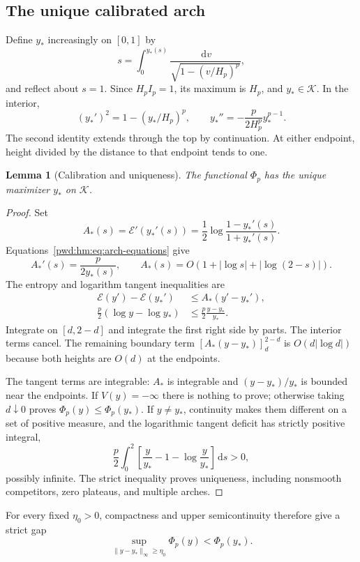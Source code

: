 \documentclass[11pt,letterpaper]{article}
\numberwithin{equation}{section}
\newtheorem{lemma}[theorem]{Lemma}
\theoremstyle{remark}\newtheorem{remark}[theorem]{Remark}
\newcommand{\K}{\mathcal K}\newcommand{\ee}{\mathrm e}\newcommand{\dd}{\,\mathrm d}
\begin{document}
\subsection{The unique calibrated arch}
Define $y_*$ increasingly on $[0,1]$ by
\begin{equation}\label{pwd:hm:eq:arch-definition}
 s=\int_0^{y_*(s)}\frac{\dd v}{\sqrt{1-(v/H_p)^p}},
\end{equation}
and reflect about $s=1$. Since $H_pI_p=1$, its maximum is $H_p$, and $y_*\in\K$. In the interior,
\begin{equation}\label{pwd:hm:eq:arch-equations}
 (y_*')^2=1-(y_*/H_p)^p,\qquad
 y_*''=-\frac p{2H_p^p}y_*^{p-1}.
\end{equation}
The second identity extends through the top by continuation. At either endpoint, height divided by the distance to that endpoint tends to one.

\begin{lemma}[Calibration and uniqueness]\label{pwd:hm:lem:calibration}
The functional $\Phi_p$ has the unique maximizer $y_*$ on $\K$.
\end{lemma}
\begin{proof}
Set
\[
 A_*(s)=\mathcal E'(y_*'(s))
 =\frac12\log\frac{1-y_*'(s)}{1+y_*'(s)}.
\]
Equations~\eqref{pwd:hm:eq:arch-equations} give
\[
 A_*'(s)=\frac{p}{2y_*(s)},\qquad
 A_*(s)=O(1+|\log s|+|\log(2-s)|).
\]
The entropy and logarithm tangent inequalities are
\begin{align*}
 \mathcal E(y')-\mathcal E(y_*')&\le A_*(y'-y_*'),\\
 \frac p2(\log y-\log y_*)&\le\frac p2\frac{y-y_*}{y_*}.
\end{align*}
Integrate on $[d,2-d]$ and integrate the first right side by parts. The interior terms cancel. The remaining boundary term
$[A_*(y-y_*)]_d^{2-d}$ is $O(d|\log d|)$ because both heights are $O(d)$ at the endpoints.

The tangent terms are integrable: $A_*$ is integrable and $(y-y_*)/y_*$ is bounded near the endpoints. If $V(y)=-\infty$ there is nothing to prove; otherwise taking $d\downarrow0$ proves $\Phi_p(y)\le\Phi_p(y_*)$. If $y\ne y_*$, continuity makes them different on a set of positive measure, and the logarithmic tangent deficit has strictly positive integral,
\[
 \frac p2\int_0^2\left[\frac y{y_*}-1-\log\frac y{y_*}\right]\dd s>0,
\]
possibly infinite. The strict inequality proves uniqueness, including nonsmooth competitors, zero plateaus, and multiple arches.
\end{proof}
For every fixed $\eta_0>0$, compactness and upper semicontinuity therefore give a strict gap
\begin{equation}\label{pwd:hm:eq:gap}
 \sup_{\|y-y_*\|_\infty\ge\eta_0}\Phi_p(y)<\Phi_p(y_*).
\end{equation}
\end{document}
